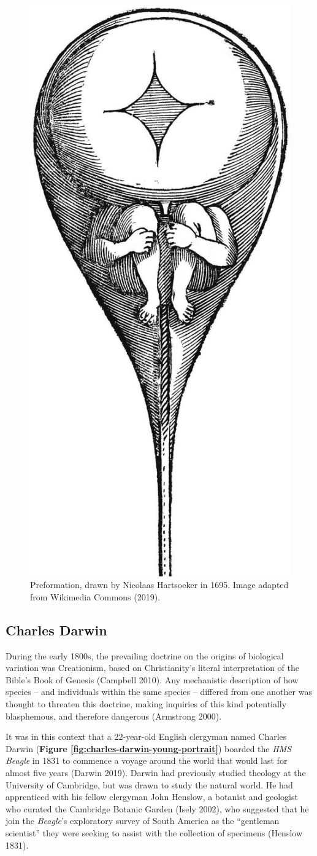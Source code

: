 \documentclass[
]{book}
\begin{document}
\begin{figure}

{\centering \includegraphics[width=0.5\linewidth]{figs/introduction/homunculus} 

}

\caption{Preformation, drawn by Nicolaas Hartsoeker in 1695. Image adapted from Wikimedia Commons (2019).}\label{fig:homunculus-pic}
\end{figure}

\hypertarget{charles-darwin}{%
\subsection{Charles Darwin}\label{charles-darwin}}

During the early 1800s, the prevailing doctrine on the origins of biological variation was Creationism, based on Christianity's literal interpretation of the Bible's Book of Genesis (Campbell 2010). Any mechanistic description of how species -- and individuals within the same species -- differed from one another was thought to threaten this doctrine, making inquiries of this kind potentially blasphemous, and therefore dangerous (Armstrong 2000).

It was in this context that a 22-year-old English clergyman named Charles Darwin (\textbf{Figure \ref{fig:charles-darwin-young-portrait}}) boarded the \emph{HMS Beagle} in 1831 to commence a voyage around the world that would last for almost five years (Darwin 2019). Darwin had previously studied theology at the University of Cambridge, but was drawn to study the natural world. He had apprenticed with his fellow clergyman John Henslow, a botanist and geologist who curated the Cambridge Botanic Garden (Isely 2002), who suggested that he join the \emph{Beagle}'s exploratory survey of South America as the ``gentleman scientist'' they were seeking to assist with the collection of specimens (Henslow 1831).
\end{document}
